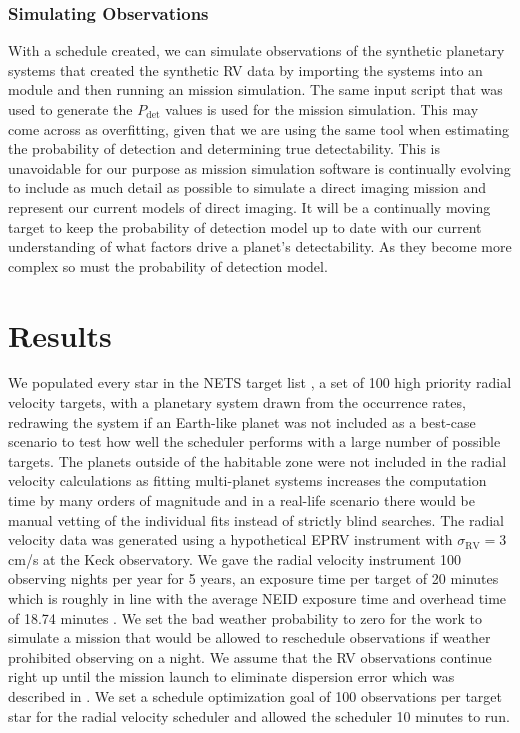 \subsubsection{Simulating Observations}

With a schedule created, we can simulate observations of the synthetic planetary
systems that created the synthetic RV data by importing the systems into an
  module and then running an
 mission simulation. The same  input script that
was used to generate the $P_\textrm{det}$ values is used for the mission
simulation. This may come across as overfitting, given that we are using the
same tool when estimating the probability of detection and determining true
detectability. This is unavoidable for our purpose as mission simulation
software is continually evolving to include as much detail as possible to
simulate a direct imaging mission and represent our current models of direct
imaging. It will be a continually moving target to keep the probability of
detection model up to date with our current understanding of what factors drive
a planet's detectability. As they become more complex so must the probability
of detection model.

\section{Results}

We populated every star in the NETS target list
\citep{guptaTargetPrioritization2021}, a set of 100 high priority radial
velocity targets, with a planetary system drawn from the
\citet{dulzJointRadialVelocity2020} occurrence rates, redrawing the system if
an Earth-like planet was not included as a best-case scenario to test how well
the scheduler performs with a large number of possible targets. The planets
outside of the habitable zone were not included in the radial velocity
calculations as fitting multi-planet systems increases the computation time by
many orders of magnitude and in a real-life scenario there would be manual
vetting of the individual fits instead of strictly blind searches. The radial
velocity data was generated using a hypothetical EPRV instrument with
$\sigma_\textrm{RV} = 3$ cm/s at the Keck observatory. We gave the radial
velocity instrument 100 observing nights per year for 5 years, an exposure time
per target of 20 minutes which is roughly in line with the average NEID
exposure time and overhead time of 18.74 minutes
\citep{guptaTargetPrioritization2021}. We set the bad weather probability to
zero for the work to simulate a mission that would be allowed to reschedule
observations if weather prohibited observing on a night. We assume that the RV
observations continue right up until the mission launch to eliminate dispersion
error which was described in . We set a schedule
optimization goal of 100 observations per target star for the radial velocity
scheduler and allowed the scheduler 10 minutes to run.

